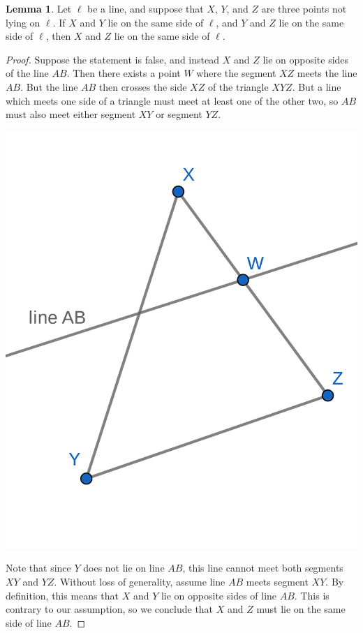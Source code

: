 \documentclass{tufte-handout}
\theoremstyle{definition}
\newtheorem{lemma}[theorem]{Lemma}
\begin{document}
\clearpage

\begin{lemma}\label{lemma:same-side-transitive}
Let $\ell$ be a line, and suppose that $X$, $Y$, and $Z$ are three points not lying on $\ell$. If $X$ and $Y$ lie on the same side of $\ell$, and $Y$ and $Z$ lie on the same side of $\ell$, then $X$ and $Z$ lie on the same side of $\ell$.
\end{lemma}

\begin{proof}
Suppose the statement is false, and instead $X$ and $Z$ lie on opposite sides of the line $AB$. Then there exists a point $W$ where the segment $XZ$ meets the line $AB$. But the line $AB$ then crosses the side $XZ$ of the triangle $XYZ$. But a line which meets one side of a triangle must meet at least one of the other two, so $AB$ must also meet either segment $XY$ or segment $YZ$.

\begin{marginfigure}
  \includegraphics{images/transitive.png}
\end{marginfigure}

Note that since $Y$ does not lie on line $AB$, this line cannot meet both segments $XY$ and $YZ$.
Without loss of generality, assume line $AB$ meets segment $XY$. By definition, this means that $X$ and $Y$ lie on opposite sides of line $AB$. This is contrary to our assumption, so we conclude that $X$ and $Z$ must lie on the same side of line $AB$.
\end{proof}
\end{document}
